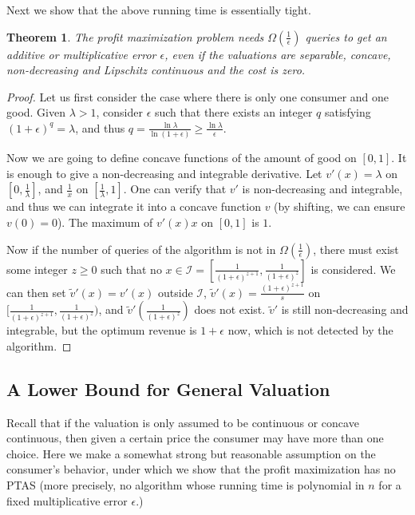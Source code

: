 \documentclass{article}
\newtheorem{theorem}{Theorem}[section]
\begin{document}
Next we show that the above running time is essentially tight.
\begin{theorem}
    The profit maximization problem needs $\Omega(\frac{1}{\epsilon})$ queries to get an additive or multiplicative error $\epsilon$, even if the valuations are separable, concave, non-decreasing and Lipschitz continuous and the cost is zero.
\end{theorem}
\begin{proof}
    Let us first consider the case where there is only one consumer and one good. Given $\lambda>1$, consider $\epsilon$ such that there exists an integer $q$ satisfying $(1+\epsilon)^q=\lambda$, and thus $q=\frac{\ln\lambda}{\ln(1+\epsilon)}\ge \frac{\ln\lambda}{\epsilon}$.

    Now we are going to define concave functions of the amount of good on $[0,1]$. It is enough to give a non-decreasing and integrable derivative. Let $v'(x)=\lambda$ on $[0,\frac{1}{\lambda}]$, and $\frac{1}{x}$ on $[\frac{1}{\lambda},1]$. One can verify that $v'$ is non-decreasing and integrable, and thus we can integrate it into a concave function $v$ (by shifting, we can ensure $v(0)=0$). The maximum of $v'(x)x$ on $[0,1]$ is $1$.

    Now if the number of queries of the algorithm is not in $\Omega(\frac{1}{\epsilon})$, there must exist some integer $z\ge0$ such that no $x\in \mathcal{I}=[\frac{1}{(1+\epsilon)^{z+1}},\frac{1}{(1+\epsilon)^z}]$ is considered. We can then set $\tilde{v}'(x)=v'(x)$ outside $\mathcal{I}$, $\tilde{v}'(x)=\frac{(1+\epsilon)^{z+1}}{s}$ on $[\frac{1}{(1+\epsilon)^{z+1}},\frac{1}{(1+\epsilon)^z})$, and $\tilde{v}'(\frac{1}{(1+\epsilon)^z})$ does not exist. $\tilde{v}'$ is still non-decreasing and integrable, but the optimum revenue is $1+\epsilon$ now, which is not detected by the algorithm.
\end{proof}

\subsection{A Lower Bound for General Valuation}
Recall that if the valuation is only assumed to be continuous or concave continuous, then given a certain price the consumer may have more than one choice. Here we make a somewhat strong but reasonable assumption on the consumer's behavior, under which we show that the profit maximization has no PTAS (more precisely, no algorithm whose running time is polynomial in $n$ for a fixed multiplicative error $\epsilon$.)
\end{document}
